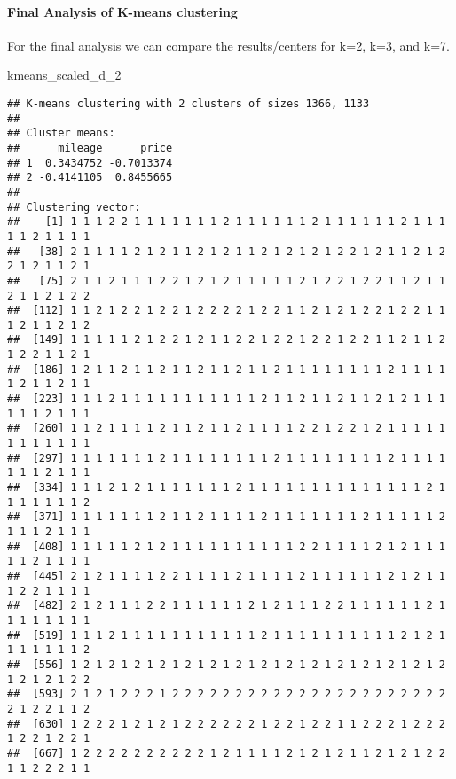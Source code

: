\documentclass[
]{article}
\newenvironment{Shaded}{\begin{snugshade}}{\end{snugshade}}
\newcommand{\NormalTok}[1]{#1}
\begin{document}
\hypertarget{final-analysis-of-k-means-clustering}{%
\paragraph{Final Analysis of K-means
clustering}\label{final-analysis-of-k-means-clustering}}

For the final analysis we can compare the results/centers for k=2, k=3,
and k=7.

\begin{Shaded}
\begin{Highlighting}[]
\NormalTok{kmeans\_scaled\_d\_2}
\end{Highlighting}
\end{Shaded}

\begin{verbatim}
## K-means clustering with 2 clusters of sizes 1366, 1133
## 
## Cluster means:
##      mileage      price
## 1  0.3434752 -0.7013374
## 2 -0.4141105  0.8455665
## 
## Clustering vector:
##    [1] 1 1 1 2 2 1 1 1 1 1 1 1 2 1 1 1 1 1 1 2 1 1 1 1 1 1 2 1 1 1 1 1 2 1 1 1 1
##   [38] 2 1 1 1 1 2 1 2 1 1 2 1 2 1 1 2 1 2 1 2 1 2 2 1 2 1 1 2 1 2 2 1 2 1 1 2 1
##   [75] 2 1 1 2 1 1 1 2 2 1 2 1 2 1 1 1 1 1 2 1 2 2 1 2 2 1 1 2 1 1 2 1 1 2 1 2 2
##  [112] 1 1 2 1 2 2 1 2 2 1 2 2 2 2 1 2 2 1 1 2 1 2 1 2 2 1 2 2 1 1 1 2 1 1 2 1 2
##  [149] 1 1 1 1 1 2 1 2 2 1 2 1 1 2 2 1 2 2 1 2 2 1 2 2 1 1 2 1 1 2 1 2 2 1 1 2 1
##  [186] 1 2 1 1 2 1 1 2 1 1 2 1 1 2 1 1 2 1 1 1 1 1 1 1 1 2 1 1 1 1 1 2 1 1 2 1 1
##  [223] 1 1 1 2 1 1 1 1 1 1 1 1 1 1 1 2 1 1 2 1 1 2 1 1 2 1 2 1 1 1 1 1 1 2 1 1 1
##  [260] 1 1 2 1 1 1 1 2 1 1 2 1 1 2 1 1 1 1 2 2 1 2 2 1 2 1 1 1 1 1 1 1 1 1 1 1 1
##  [297] 1 1 1 1 1 1 1 2 1 1 1 1 1 1 1 1 2 1 1 1 1 1 1 1 1 2 1 1 1 1 1 1 1 2 1 1 1
##  [334] 1 1 1 2 1 2 1 1 1 1 1 1 1 2 1 1 1 1 1 1 1 1 1 1 1 1 1 1 2 1 1 1 1 1 1 1 2
##  [371] 1 1 1 1 1 1 1 2 1 1 2 1 1 1 1 2 1 1 1 1 1 1 1 2 1 1 1 1 1 2 1 1 1 2 1 1 1
##  [408] 1 1 1 1 1 2 1 2 1 1 1 1 1 1 1 1 1 1 2 2 1 1 1 1 2 1 2 1 1 1 1 1 2 1 1 1 1
##  [445] 2 1 2 1 1 1 1 2 2 1 1 1 1 2 1 1 1 1 2 1 1 1 1 1 1 2 1 2 1 1 1 2 2 1 1 1 1
##  [482] 2 1 2 1 1 1 2 2 1 1 1 1 1 1 2 1 2 1 1 1 2 2 1 1 1 1 1 1 2 1 1 1 1 1 1 1 1
##  [519] 1 1 1 2 1 1 1 1 1 1 1 1 1 1 1 2 1 1 1 1 1 1 1 1 1 1 2 1 2 1 1 1 1 1 1 1 2
##  [556] 1 2 1 2 1 2 1 2 1 2 1 2 1 2 1 2 1 2 1 2 1 2 1 2 1 2 1 2 1 2 1 2 1 2 1 2 2
##  [593] 2 1 2 1 2 2 2 1 2 2 2 2 2 2 2 2 2 2 2 2 2 2 2 2 2 2 2 2 2 2 2 1 2 2 1 1 2
##  [630] 1 2 2 2 1 2 1 2 1 2 2 2 2 2 2 1 2 2 1 2 2 1 1 2 2 2 1 2 2 2 1 2 2 1 2 2 1
##  [667] 1 2 2 2 2 2 2 2 2 2 2 1 2 1 1 1 1 2 1 2 1 2 1 1 2 1 2 1 2 2 1 1 2 2 2 1 1

\end{verbatim}
\end{document}
